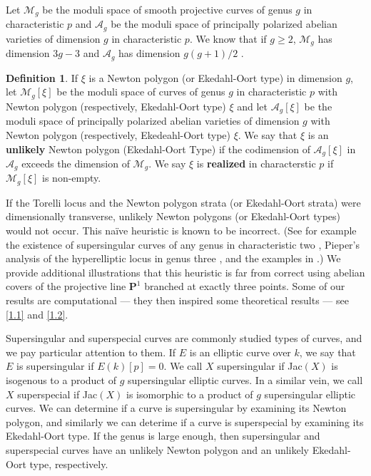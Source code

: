 \documentclass{article}
\theoremstyle{remark}
\theoremstyle{definition}
\newtheorem{definition}[theorem]{Definition}
\begin{document}
\par Let $\mathcal{M}_g$ be the moduli space of smooth projective curves of genus $g$ in characteristic $p$ and $\mathcal{A}_g$ be the moduli space of principally polarized abelian varieties of dimension $g$ in characteristic $p$. We know that if $g \geq 2$, $\mathcal{M}_g$ has dimension $3g-3$ and $\mathcal{A}_g$ has dimension $g(g+1)/2$ \cite[Section 5.3]{pries_newtonpolygons}. 
\begin{definition}
\label{unlikely}
    If $\xi$ is a Newton polygon (or Ekedahl-Oort type) in dimension $g$, let $\mathcal{M}_g[\xi]$ be the moduli space of curves of genus $g$ in characteristic $p$ with Newton polygon (respectively, Ekedahl-Oort type) $\xi$ and let $\mathcal{A}_g[\xi]$ be the moduli space of principally polarized abelian varieties of dimension $g$ with Newton polygon (respectively, Ekedeahl-Oort type) $\xi$. We say that $\xi$ is an \textbf{unlikely} Newton polygon (Ekedahl-Oort Type) if the codimension of $\mathcal{A}_g[\xi]$ in $\mathcal{A}_g$ exceeds the dimension of $\mathcal{M}_g$. We say $\xi$ is \textbf{realized} in characterstic $p$ if $\mathcal{M}_g[\xi]$ is non-empty.
\end{definition}

\par If the Torelli locus and the Newton polygon strata (or Ekedahl-Oort strata) were dimensionally transverse, unlikely Newton polygons (or Ekedahl-Oort types) would not occur.  This na\"{i}ve heuristic is known to be incorrect. (See for example the existence of supersingular curves of any genus in characteristic two \cite{MR1310953}, Pieper's analysis of the hyperelliptic locus in genus three \cite{pieper}, and the examples in \cite{booher_supersingular_2025}.) We provide additional illustrations that this heuristic is far from correct using abelian covers of the projective line $\mathbf{P}^1$ branched at exactly three points. Some of our results are computational --- they then inspired some theoretical results --- see \ref{1.1} and \ref{1.2}.

\par Supersingular and superspecial curves are commonly studied types of curves, and we pay particular attention to them. If $E$ is an elliptic curve over $k$, we say that $E$ is supersingular if $E(k)[p] = 0$. We call $X$ supersingular if Jac$(X)$ is isogenous to a product of $g$ supersingular elliptic curves. In a similar vein, we call $X$ superspecial if Jac$(X)$ is isomorphic to a product of $g$ supersingular elliptic curves. We can determine if a curve is supersingular by examining its Newton polygon, and similarly we can deterime if a curve is superspecial by examining its Ekedahl-Oort type. If the genus is large enough, then supersingular and superspecial curves have an unlikely Newton polygon and an unlikely Ekedahl-Oort type, respectively.
\end{document}
